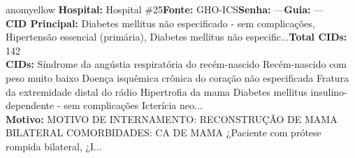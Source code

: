 \documentclass[a4paper,10pt]{article}
\begin{document}
\begin{anomalycard}[Interna\c{c}\~{a}o \#483 | Pac. \#556 | MODERADO (z=2.54) | LOS: 2d | 10/03/2026\,$\to$\,12/03/2026]{anomyellow}
\textbf{Hospital:} Hospital \#25\quad \textbf{Fonte:} GHO-ICS\quad \textbf{Senha:} ---\quad \textbf{Guia:} ---\\

\textbf{CID Principal:} {\small Diabetes mellitus não especificado - sem complicações, Hipertensão essencial (primária), Diabetes mellitus não especific...}\quad\textbf{Total CIDs:} 142\\

\textbf{CIDs:} {\scriptsize Síndrome da angústia respiratória do recém-nascido \textbar{} Recém-nascido com peso muito baixo \textbar{} Doença isquêmica crônica do coração não especificada \textbar{} Fratura da extremidade distal do rádio \textbar{} Hipertrofia da mama \textbar{} Diabetes mellitus insulino-dependente - sem complicações \textbar{} Icterícia neo...}\\

\textbf{Motivo:} {\scriptsize MOTIVO DE INTERNAMENTO:  RECONSTRUÇÃO DE MAMA BILATERAL  COMORBIDADES: CA DE MAMA  ¿Paciente com prótese rompida bilateral, ¿I...}\\




\end{anomalycard}
\end{document}
